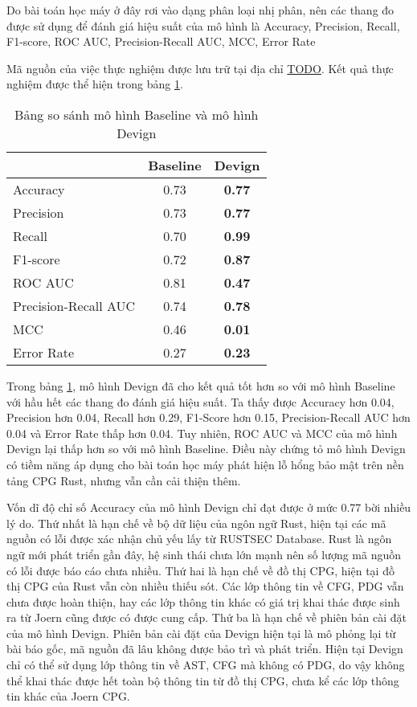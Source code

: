 Do bài toán học máy ở đây rơi vào dạng phân loại nhị phân, nên các thang đo được sử dụng để đánh giá hiệu suất của mô hình là Accuracy, Precision, Recall, F1-score, ROC AUC, Precision-Recall AUC, MCC, Error Rate

Mã nguồn của việc thực nghiệm được lưu trữ tại địa chỉ \href{TODO}{TODO}. Kết quả thực nghiệm được thể hiện trong bảng \ref{table:c4_ml}.

\begin{table}[H]
    \centering
    \caption{Bảng so sánh mô hình Baseline và mô hình Devign}
    \label{table:c4_ml}
    \begin{tabular}{l @{\hskip 2cm} c @{\hskip 2cm} c}
        \hline
         & Baseline & Devign \\
        \hline
        Accuracy & 0.73 & \textbf{0.77} \\
        Precision & 0.73 & \textbf{0.77} \\
        Recall & 0.70 & \textbf{0.99} \\
        F1-score & 0.72 & \textbf{0.87} \\
        ROC AUC & 0.81 & \textbf{0.47} \\
        Precision-Recall AUC & 0.74 & \textbf{0.78} \\
        MCC & 0.46 & \textbf{0.01} \\
        Error Rate & 0.27 & \textbf{0.23} \\
        \hline
    \end{tabular}
\end{table}

Trong bảng \ref{table:c4_ml}, mô hình Devign đã cho kết quả tốt hơn so với mô hình Baseline với hầu hết các thang đo đánh giá hiệu suất.
Ta thấy được Accuracy hơn 0.04, Precision hơn 0.04, Recall hơn 0.29, F1-Score hơn 0.15, Precision-Recall AUC hơn 0.04 và Error Rate thấp hơn 0.04.
Tuy nhiên, ROC AUC và MCC của mô hình Devign lại thấp hơn so với mô hình Baseline.
Điều này chứng tỏ mô hình Devign có tiềm năng áp dụng cho bài toán học máy phát hiện lỗ hổng bảo mật trên nền tảng CPG Rust, nhưng vẫn cần cải thiện thêm.

Vốn dĩ độ chỉ số Accuracy của mô hình Devign chỉ đạt được ở mức 0.77 bời nhiều lý do.
Thứ nhất là hạn chế về bộ dữ liệu của ngôn ngữ Rust, hiện tại các mã nguồn có lỗi được xác nhận chủ yếu lấy từ RUSTSEC Database.
Rust là ngôn ngữ mới phát triển gần đây, hệ sinh thái chưa lớn mạnh nên số lượng mã nguồn có lỗi được báo cáo chưa nhiều.
Thứ hai là hạn chế về đồ thị CPG, hiện tại đồ thị CPG của Rust vẫn còn nhiều thiếu sót.
Các lớp thông tin về CFG, PDG vẫn chưa được hoàn thiện, hay các lớp thông tin khác có giá trị khai thác được sinh ra từ Joern cũng được có được cung cấp.
Thứ ba là hạn chế về phiên bản cài đặt của mô hình Devign.
Phiên bản cài đặt của Devign hiện tại là mô phỏng lại từ bài báo gốc, mã nguồn đã lâu không được bảo trì và phát triển.
Hiện tại Devign chỉ có thể sử dụng lớp thông tin về AST, CFG mà không có PDG, do vậy không thể khai thác được hết toàn bộ thông tin từ đồ thị CPG, chưa kể các lớp thông tin khác của Joern CPG.

